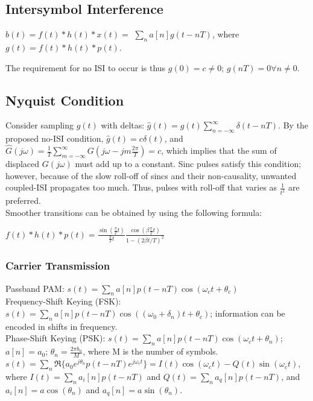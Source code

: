 \documentclass[8pt]{extarticle}
\begin{document}
\begin{multicols*}{3}
\begin{center}
\subsection{Intersymbol Interference}
\( b(t) = f(t) * h(t) * x(t) = \) \( \sum_n a[n]g(t-nT) \), where \( g(t) = f(t)*h(t)*p(t) \).

The requirement for no ISI to occur is thus \( g(0) = c \neq 0 \); \( g(nT) = 0 \forall n \neq 0 \).

\subsection{Nyquist Condition}
Consider sampling \( g(t) \) with deltas: \( \hat{g}(t) = g(t)\sum_{n=-\infty}^{\infty} \delta(t-nT) \). By the proposed no-ISI condition, \( \hat{g}(t) = c\delta(t) \), and \( \hat{G}(j\omega) = \frac{1}{T} \sum_{m=-\infty}^{\infty} G(j\omega - jm\frac{2\pi}{T}) = c \), which implies that the sum of displaced \( G(j\omega) \) must add up to a constant. Sinc pulses satisfy this condition; however, because of the slow roll-off of sincs and their non-causality, unwanted coupled-ISI propagates too much. Thus, pulses with roll-off that varies as \( \frac{1}{t^2} \) are preferred. \\

Smoother transitions can be obtained by using the following formula:

\( f(t) * h(t) * p(t) = \frac{\sin{\left( \frac{\pi}{T} t\right)}}{\frac{\pi}{T} t} \frac{\cos{\left(\beta \frac{\pi}{T} t\right)}}{1-(2\beta t/T)^2} \)

\subsubsection{Carrier Transmission}
Passband PAM: \( s(t) = \sum_n a[n]p(t-nT)\cos{\left(\omega_c t + \theta_c\right)} \) \\

Frequency-Shift Keying (FSK): \( s(t) = \sum_n a[n]p(t-nT) \cos{\left((\omega_0 + \delta_n)t+\theta_c\right)} \); information can be encoded in shifts in frequency. \\

Phase-Shift Keying (PSK): \( s(t) = \sum_n a[n]p(t-nT) \cos{\left(\omega_c t + \theta_n\right)} \); \( a[n] = a_0 \); \( \theta_n = \frac{2\pi b_n}{M} \), where M is the number of symbols. \( s(t) = \sum_n \Re{\{ a_0 e^{j\theta_n}p(t-nT)e^{j\omega_c t}\}} = I(t)\cos{\left(\omega_c t \right)} - Q(t)\sin{\left( \omega_c t \right)} \), where \( I(t) = \sum_n a_i[n] p(t-nT) \) and \( Q(t) = \sum_n a_q[n]p(t-nT) \), and \( a_i[n] = a \cos{\left(\theta_n\right)} \) and \( a_q[n] = a \sin{\left(\theta_n\right)} \). \\


\end{center}
\end{multicols*}
\end{document}
